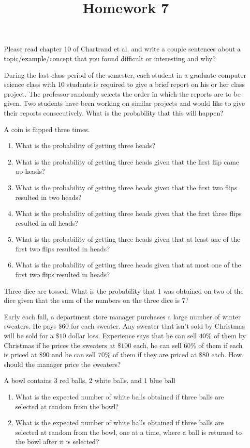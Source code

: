 \documentclass{homework}
\title{Homework 7}
\begin{document}
 \maketitle

\question Please read chapter 10 of Chartrand et al. and write a couple sentences about a topic/example/concept that you found difficult or interesting and why?

\question During the last class period of the semester, each student in a graduate computer science class with 10 students is required to give a brief report on his or her class project. The professor randomly selects the order in which the reports are to be given. Two students have been working on similar projects and would like to give their reports consecutively. What is the probability that this will happen?

\question A coin is flipped three times.

\begin{enumerate}[label=(\alph*)]
	\item What is the probability of getting three heads?
	\item What is the probability of getting three heads given that the first flip came up heads?
	\item What is the probability of getting three heads given that the first two flips resulted in two heads?
	\item What is the probability of getting three heads given that the first three flips resulted in all heads?
	\item What is the probability of getting three heads given that at least one of the first two flips resulted in heads?
	\item What is the probability of getting three heads given that at most one of the first two flips resulted in heads?
\end{enumerate}

\question Three dice are tossed. What is the probability that 1 was obtained on two of the dice given that the sum of the numbers on the three dice is 7?

\question Early each fall, a department store manager purchases a large number of winter sweaters. He pays $\$60$ for each sweater. Any sweater that isn’t sold by Christmas will be sold for a $\$10$ dollar loss. Experience says that he can sell $40\%$ of them by Christmas if he prices the sweaters at $\$100$ each, he can sell $60\%$ of them if each is priced at $\$90$ and he can sell $70\%$ of them if they are priced at $\$80$ each. How should the manager price the sweaters?

\question A bowl contains 3 red balls, 2 white balls, and 1 blue ball
\begin{enumerate}[label=(\alph*)]
	\item What is the expected number of white balls obtained if three balls are selected at random from the bowl?
	\item What is the expected number of white balls obtained if three balls are selected at random from the bowl, one at a time, where a ball is returned to the bowl after it is selected?
\end{enumerate}
\end{document}
